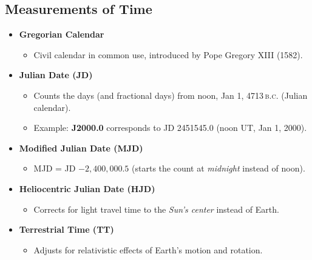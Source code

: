 \subsection{Measurements of Time}
\begin{itemize}
  \item \textbf{Gregorian Calendar}
  \begin{itemize}
    \item Civil calendar in common use, introduced by Pope Gregory XIII (1582).
  \end{itemize}
  \item \textbf{Julian Date (JD)}
  \begin{itemize}
    \item Counts the days (and fractional days) from noon, Jan 1, 4713\,\textsc{b.c.} (Julian calendar).
    \item Example: \textbf{J2000.0} corresponds to JD 2451545.0 (noon UT, Jan 1, 2000).
  \end{itemize}
  \item \textbf{Modified Julian Date (MJD)}
  \begin{itemize}
    \item MJD = JD $- 2{,}400{,}000.5$ (starts the count at \emph{midnight} instead of noon).
  \end{itemize}
  \item \textbf{Heliocentric Julian Date (HJD)}
  \begin{itemize}
    \item Corrects for light travel time to the \emph{Sun’s center} instead of Earth.
  \end{itemize}
  \item \textbf{Terrestrial Time (TT)}
  \begin{itemize}
    \item Adjusts for relativistic effects of Earth’s motion and rotation.
  \end{itemize}
\end{itemize}

